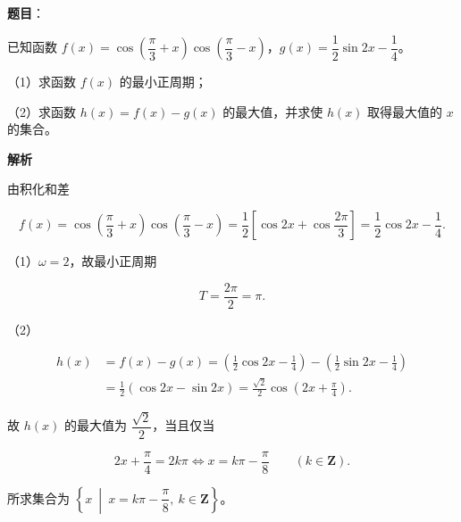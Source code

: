 \begin{answer}

\textbf{题目}：

已知函数 $f(x)=\cos\left(\dfrac\pi3+x\right)\cos\left(\dfrac\pi3-x\right)$，$g(x)=\dfrac12\sin2x-\dfrac14$。

（1）求函数 $f(x)$ 的最小正周期；

（2）求函数 $h(x)=f(x)-g(x)$ 的最大值，并求使 $h(x)$ 取得最大值的 $x$ 的集合。

\textbf{解析}

由积化和差

\nopagebreak[4]
\[f(x)=\cos\left(\frac\pi3+x\right)\cos\left(\frac\pi3-x\right)
=\frac12\left[\cos2x+\cos\frac{2\pi}3\right]
=\frac12\cos2x-\frac14.\]

（1）$\omega=2$，故最小正周期

\nopagebreak[4]
\[T=\frac{2\pi}{2}=\pi.\]

（2）

\nopagebreak[4]
\[\begin{aligned}
h(x)&=f(x)-g(x)=\left(\frac12\cos2x-\frac14\right)-\left(\frac12\sin2x-\frac14\right)\\
&=\frac12(\cos2x-\sin2x)=\frac{\sqrt2}{2}\cos\left(2x+\frac\pi4\right).
\end{aligned}\]

故 $h(x)$ 的最大值为 $\dfrac{\sqrt2}{2}$，当且仅当

\nopagebreak[4]
\[2x+\frac\pi4=2k\pi\iff x=k\pi-\frac\pi8\qquad(k\in\mathbf Z).\]

所求集合为 $\left\{x\ \middle|\ x=k\pi-\dfrac\pi8,\ k\in\mathbf Z\right\}$。


\end{answer}
